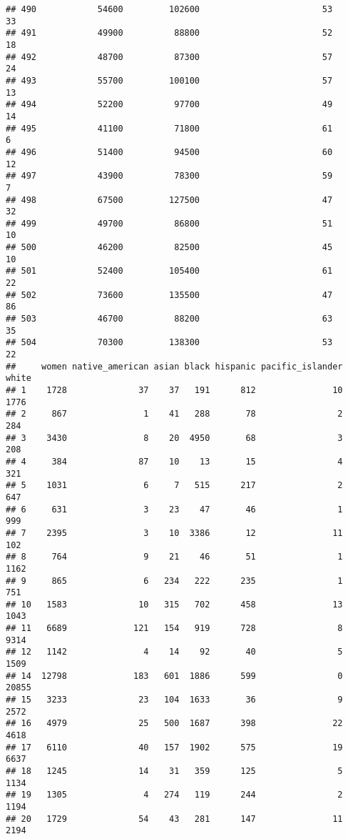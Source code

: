 \documentclass[
]{article}
\begin{document}
\begin{verbatim}
## 490            54600         102600                        53           33
## 491            49900          88800                        52           18
## 492            48700          87300                        57           24
## 493            55700         100100                        57           13
## 494            52200          97700                        49           14
## 495            41100          71800                        61            6
## 496            51400          94500                        60           12
## 497            43900          78300                        59            7
## 498            67500         127500                        47           32
## 499            49700          86800                        51           10
## 500            46200          82500                        45           10
## 501            52400         105400                        61           22
## 502            73600         135500                        47           86
## 503            46700          88200                        63           35
## 504            70300         138300                        53           22
##     women native_american asian black hispanic pacific_islander white
## 1    1728              37    37   191      812               10  1776
## 2     867               1    41   288       78                2   284
## 3    3430               8    20  4950       68                3   208
## 4     384              87    10    13       15                4   321
## 5    1031               6     7   515      217                2   647
## 6     631               3    23    47       46                1   999
## 7    2395               3    10  3386       12               11   102
## 8     764               9    21    46       51                1  1162
## 9     865               6   234   222      235                1   751
## 10   1583              10   315   702      458               13  1043
## 11   6689             121   154   919      728                8  9314
## 12   1142               4    14    92       40                5  1509
## 14  12798             183   601  1886      599                0 20855
## 15   3233              23   104  1633       36                9  2572
## 16   4979              25   500  1687      398               22  4618
## 17   6110              40   157  1902      575               19  6637
## 18   1245              14    31   359      125                5  1134
## 19   1305               4   274   119      244                2  1194
## 20   1729              54    43   281      147               11  2194

\end{verbatim}
\end{document}
